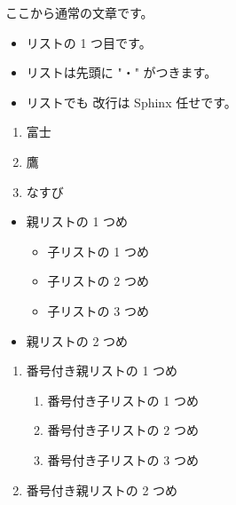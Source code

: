 \documentclass[letterpaper,10pt,dvipdfmx]{sphinxmanual}
\begin{document}
\sphinxAtStartPar
ここから通常の文章です。
\begin{itemize}
\item {} 
\sphinxAtStartPar
リストの 1 つ目です。

\item {} 
\sphinxAtStartPar
リストは先頭に "・" がつきます。

\item {} 
\sphinxAtStartPar
リストでも
改行は Sphinx 任せです。

\end{itemize}
\begin{enumerate}
%
\item {} 
\sphinxAtStartPar
富士

\item {} 
\sphinxAtStartPar
鷹

\item {} 
\sphinxAtStartPar
なすび

\end{enumerate}
\begin{itemize}
\item {} 
\sphinxAtStartPar
親リストの 1 つめ
\begin{itemize}
\item {} 
\sphinxAtStartPar
子リストの 1 つめ

\item {} 
\sphinxAtStartPar
子リストの 2 つめ

\item {} 
\sphinxAtStartPar
子リストの 3 つめ

\end{itemize}

\item {} 
\sphinxAtStartPar
親リストの 2 つめ

\end{itemize}
\begin{enumerate}
%
\item {} 
\sphinxAtStartPar
番号付き親リストの 1 つめ
\begin{enumerate}
%
\item {} 
\sphinxAtStartPar
番号付き子リストの 1 つめ

\item {} 
\sphinxAtStartPar
番号付き子リストの 2 つめ

\item {} 
\sphinxAtStartPar
番号付き子リストの 3 つめ

\end{enumerate}

\item {} 
\sphinxAtStartPar
番号付き親リストの 2 つめ

\end{enumerate}
\end{document}
